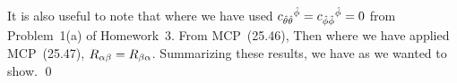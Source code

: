 {	It is also useful to note that
	where we have used $c_{\hat{\theta} \hat{\theta}}{}^{\hat{\phi}} = c_{\hat{\phi} \hat{\phi}}{}^{\hat{\phi}} = 0$ from Problem~1(a) of Homework~3.  From MCP~(25.46),
	Then
	where we have applied MCP~(25.47), $R_{\alpha \beta} = R_{\beta \alpha}$.  Summarizing these results, we have  as we wanted to show. \qed
	
}
